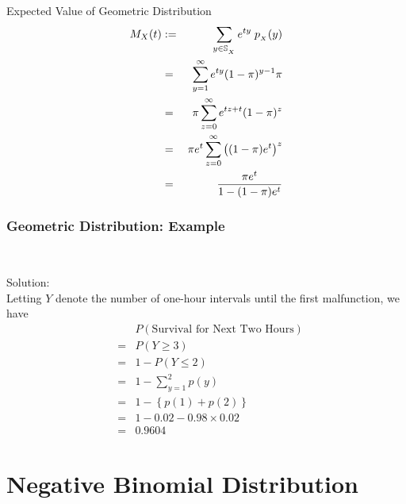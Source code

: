 \documentclass[compress]{beamer}
\begin{document}
\begin{frame}{Expected Value of Geometric Distribution}
\begin{eqnarray}
M_X(t)& := &  \sum_{y\in \support[X]} e^{ty}\; \pmf_{_X}(y) \nonumber\\
& = &  \sum_{y=1}^{\infty } e^{ty}  (1-\binP)^{y-1}\binP \nonumber\\
& = & \binP   \sum_{z=0}^{\infty } e^{tz+t}  (1-\binP)^{z} \nonumber\\
& = &  \binP e^t   \sum_{z=0}^{\infty } \left((1-\binP)e^{t}\right)^z\nonumber\\
& = & \frac{\binP e^t}{1-(1-\binP)e^{t}} 
\end{eqnarray}



\end{frame}



\begin{frame}\frametitle{Geometric Distribution: Example}
\vspace{-.1in}
\\
\pause

\vspace{.1in}
{\tiny Solution: \\
Letting $Y$ denote the number of one-hour intervals until the first
malfunction, we have 
\begin{eqnarray}
& & P(\text{Survival for Next Two Hours})\nonumber\\
& =&  P(Y\geq 3)\nonumber\\
& =& 1- P(Y\leq 2)\nonumber\\
& = &1-   \sum_{y=1}^{2}p(y)\nonumber\\
& = &1-   \left\{ p(1)+p(2)\right\}\nonumber\\
& =& 1-0.02-0.98\times 0.02\nonumber\\
& =& 0.9604\nonumber
\end{eqnarray}
}

\end{frame}



\section{Negative Binomial Distribution }
\end{document}
